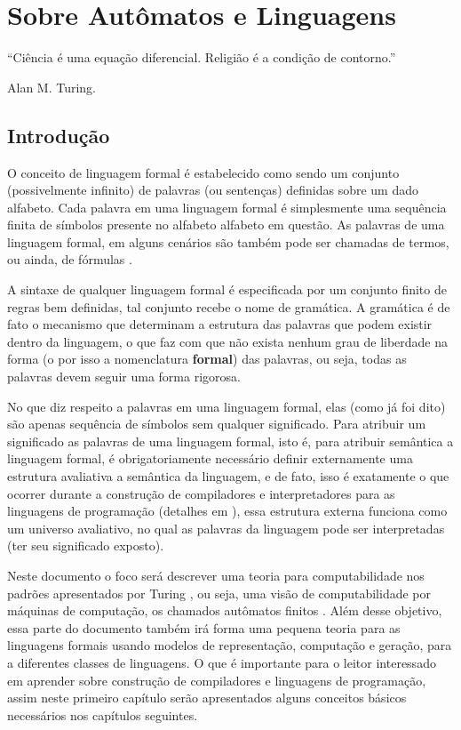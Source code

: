 \chapter{Sobre Autômatos e Linguagens}\label{cap:IntroFLA}

\epigraph{``Ciência é uma equação diferencial. Religião é a condição de contorno.''}{Alan M. Turing.}

\section{Introdução}\label{sec:IntroComputabilite}

O conceito de linguagem formal é estabelecido como sendo um conjunto (possivelmente infinito) de palavras (ou sentenças) definidas sobre um dado alfabeto. Cada palavra em uma linguagem formal é simplesmente uma sequência finita de símbolos presente no alfabeto alfabeto em questão. As palavras de uma linguagem formal, em alguns cenários são também pode ser chamadas de termos, ou ainda, de fórmulas \cite{joaoPavao2014}.

A sintaxe de qualquer linguagem formal é especificada por um conjunto finito de regras bem definidas, tal conjunto recebe o nome de gramática. A gramática é de fato o mecanismo que determinam a estrutura das palavras que podem existir dentro da linguagem, o que faz com que não exista nenhum grau de liberdade na forma (o por isso a nomenclatura \textbf{formal}) das palavras\cite{benja-Logica}, ou seja, todas as palavras devem seguir uma forma rigorosa. 

No que diz respeito a palavras em uma linguagem formal, elas (como já foi dito) são apenas sequência de símbolos sem qualquer significado. Para atribuir um significado as palavras de uma linguagem formal, isto é, para atribuir semântica a linguagem formal, é obrigatoriamente necessário definir externamente uma estrutura avaliativa a semântica da linguagem, e de fato, isso é exatamente o que ocorrer durante a construção de compiladores e interpretadores para as linguagens de programação (detalhes em \cite{aho2007, cooper2017}), essa estrutura externa funciona como um universo avaliativo, no qual as palavras da linguagem pode ser interpretadas (ter seu significado exposto).

Neste documento o foco será descrever uma teoria para computabilidade nos padrões apresentados por Turing \cite{turing1937}, ou seja, uma visão de computabilidade por máquinas de computação, os chamados autômatos finitos \cite{aho2007,hopcroft2008}. Além desse objetivo, essa parte do documento também irá forma uma pequena teoria para as linguagens formais usando modelos de representação, computação e geração, para a diferentes classes de linguagens. O que é importante para o leitor interessado em aprender sobre construção de compiladores e linguagens de programação, assim neste primeiro capítulo serão apresentados alguns conceitos básicos necessários nos capítulos seguintes.

